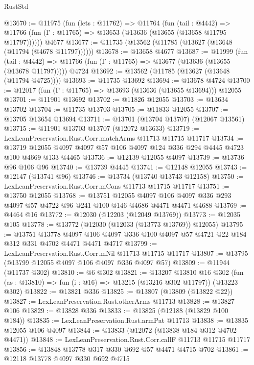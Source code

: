 \begin{lexlean}{RustStd}
\begin{coremodule}
{\begin{coremodule}
{{{{{{{{{{{{{{{{{{{{{{{{{{{{{{{{{{{{{{{{{{{{{{{{{{{{{{{{{{{{{{{{{{{{@13670 := @11975
    (fun (lets : @11762) =>
    @11764
      (fun (tail : @4442) =>
      @11766 (fun (Γ : @11765) => @13653 (@13636 (@13655 (@13658 @11795 @11797))))))
    @4677
@13677 := @11735 (@13562 (@11785 (@13627 (@13648 (@11794 (@4678 @11797))))))
@13678 := @13658 @4677
@13687 := @11999
    (fun (tail : @4442) => @11766 (fun (Γ : @11765) => @13677 (@13636 (@13655 (@13678 @11797)))))
    @4724
@13692 := @13562 (@11785 (@13627 (@13648 (@11794 @4725))))
@13693 := @11735 @13692
@13694 := @13678 @4724
@13700 := @12017 (fun (Γ : @11765) => @13693 (@13636 (@13655 @13694))) @12055
@13701 := @11901 @13692
@13702 := @11826 @12055
@13703 := @13634 @13702
@13704 := @11735 @13703
@13705 := @11833 @12055
@13707 := @13705 @13654 @13694
@13711 := @13701 (@13704 @13707) (@12067 @13561)
@13715 := @11901 @13703 @13707 (@12072 @13633)
@13719 := LexLeanPreservation.Rust.Corr.matchArms @11713 @11715 @11717
@13734 := @13719 @12055 @4097 @4097 @57 @106 @4097 @124 @336 @294 @4445 @4723 @100 @4669 @133 @4465
@13736 := @12139 @12055 @4097
@13739 := @13736 @96 @106 @96
@13740 := @13739 @4445
@13741 := @12148 @12055
@13743 := @12147 (@13741 @96)
@13746 := @13734 (@13740 @13743 @12158)
@13750 := LexLeanPreservation.Rust.Corr.mCons @11713 @11715 @11717
@13751 := @13750 @12055
@13768 := @13751
    @12055
    @4097
    @106
    @4097
    @336
    @293
    @4097
    @57
    @4722
    @96
    @241
    @100
    @146
    @4686
    @4471
    @4471
    @4688
@13769 := @4464 @16
@13772 := @12030 (@12203 (@12049 @13769))
@13773 := @12035 @105
@13778 := @13772 (@12030 (@12033 (@13773 @13769)) @12055)
@13795 := @13751
    @13778
    @4097
    @106
    @4097
    @336
    @100
    @4097
    @57
    @4721
    @22
    @184
    @312
    @331
    @4702
    @4471
    @4471
    @4717
@13799 := LexLeanPreservation.Rust.Corr.mNil @11713 @11715 @11717
@13807 := @13795 (@13799 @12055 @4097 @106 @4097 @336 @4097 @57)
@13809 := @11944 (@11737 @302)
@13810 := @6 @302
@13821 := @13207
    @13810
    @16
    @302
    (fun (as : @13810) => fun (i : @16) => @13215 (@13216 @302 @11797))
    (@13223 @302)
@13822 := @13821 @336
@13825 := @13807 (@13809 (@13822 @22))
@13827 := LexLeanPreservation.Rust.otherArms @11713
@13828 := @13827 @106
@13829 := @13828 @336
@13833 := @13825 (@12188 (@13829 @100 @184))
@13835 := LexLeanPreservation.Rust.armPat @11713
@13838 := @13835 @12055 @106 @4097
@13844 := @13833 (@12072 (@13838 @184 @312 @4702 @4471))
@13848 := LexLeanPreservation.Rust.Corr.callF @11713 @11715 @11717
@13856 := @13848 @13778 @317 @330 @692 @57 @4471 @4715 @702
@13861 := @12118 @13778 @4097 @330 @692 @4715
}}}}}}}}}}}}}}}}}}}}}}}}}}}}}}}}}}}}}}}}}}}}}}}}}}}}}}}}}}}}}}}}}}}}
\end{coremodule}}
\end{coremodule}
\end{lexlean}
